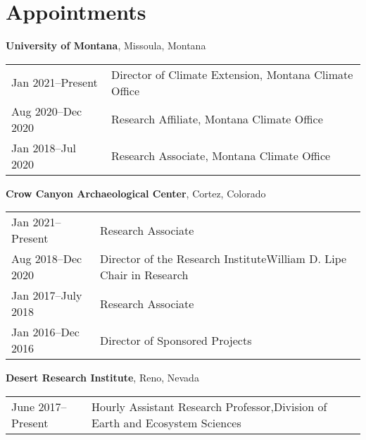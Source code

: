\section{Appointments}


{\bf University of Montana}, Missoula, Montana
\begin{list1}
\item[]
\begin{tabular}{@{}p{1.25in}p{4in}}
Jan 2021–Present  & Director of Climate Extension, Montana Climate Office\\
Aug 2020–Dec 2020  & Research Affiliate, Montana Climate Office\\
Jan 2018–Jul 2020  & Research Associate, Montana Climate Office\\
\end{tabular}
\end{list1}

{\bf Crow Canyon Archaeological Center}, Cortez, Colorado
\begin{list1}
\item[]
\begin{tabular}{@{}p{1.25in}p{4in}}
Jan 2021–Present  & Research Associate\\
Aug 2018–Dec 2020  & Director of the Research Institute\newline William D. Lipe Chair in Research\\
Jan 2017–July 2018  & Research Associate\\
Jan 2016–Dec 2016  & Director of Sponsored Projects\\
\end{tabular}
\end{list1}

{\bf Desert Research Institute}, Reno, Nevada
\begin{list1}
\item[]
\begin{tabular}{@{}p{1.25in}p{4in}}
June 2017–Present  & Hourly Assistant Research Professor,\newline Division of Earth and Ecosystem Sciences\\
\end{tabular}
\end{list1}

